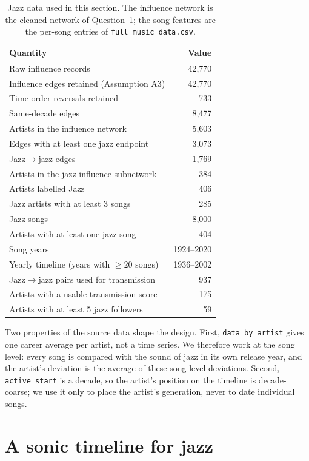 \documentclass[11pt]{article}
\begin{document}
\begin{table}[!ht]
\centering
\small
\begin{tabular}{lr}
\toprule
Quantity & Value \\
\midrule
Raw influence records & 42,770 \\
Influence edges retained (Assumption A3) & 42,770 \\
Time-order reversals retained & 733 \\
Same-decade edges & 8,477 \\
Artists in the influence network & 5,603 \\
Edges with at least one jazz endpoint & 3,073 \\
Jazz$\to$jazz edges & 1,769 \\
Artists in the jazz influence subnetwork & 384 \\
Artists labelled Jazz & 406 \\
Jazz artists with at least 3 songs & 285 \\
Jazz songs & 8,000 \\
Artists with at least one jazz song & 404 \\
Song years & 1924--2020 \\
Yearly timeline (years with $\ge 20$ songs) & 1936--2002 \\
Jazz$\to$jazz pairs used for transmission & 937 \\
Artists with a usable transmission score & 175 \\
Artists with at least 5 jazz followers & 59 \\
\bottomrule
\end{tabular}
\caption{Jazz data used in this section. The influence network is the cleaned network of
Question~1; the song features are the per-song entries of \texttt{full\_music\_data.csv}.}
\label{tab:data}
\end{table}

Two properties of the source data shape the design.
First, \texttt{data\_by\_artist} gives one career average per artist, not a time series.
We therefore work at the song level: every song is compared with the sound of jazz in its own
release year, and the artist's deviation is the average of these song-level deviations.
Second, \texttt{active\_start} is a decade, so the artist's position on the timeline is
decade-coarse; we use it only to place the artist's generation, never to date individual songs.

\section{A sonic timeline for jazz}
\end{document}
